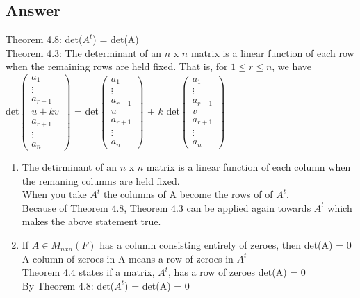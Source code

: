 \documentclass{article}
\newcommand\tab[1][1cm]{\hspace*{#1}}
\begin{document}
\subsection*{Answer}
Theorem 4.8: det(\(A^{t}\)) = det(A)
\\ Theorem 4.3: The determinant of an \(n\) x \(n\) matrix is a linear function of each row when the remaining rows are held fixed. That is, for \(1 \le r \le n\), we have 
\\ \tab[2cm] det\(\begin{pmatrix}a_{1}\\ \vdots \\a_{r-1} \\u + kv \\a_{r+1} \\ \vdots \\a_{n} \end{pmatrix}\) =
	det\(\begin{pmatrix}a_{1}\\ \vdots \\a_{r-1} \\u \\a_{r+1} \\ \vdots \\a_{n} \end{pmatrix}\) +
	\( k\) det\(\begin{pmatrix}a_{1}\\ \vdots \\a_{r-1} \\v \\a_{r+1} \\ \vdots \\a_{n} \end{pmatrix}\)
\\ \begin{enumerate}[label=(\alph{*})]
\item The detirminant of an \(n\) x \(n\) matrix is a linear function of each column when the remaning columns are held fixed.
\\	When you take \(A^{t}\) the columns of A become the rows of of \(A^{t}\).
\\	Because of Theorem 4.8, Theorem 4.3 can be applied again towards \(A^{t}\) which makes the above statement true.
\item If \(A \in M_{nxn}(F)\) has a column consisting entirely of zeroes, then det(A) = 0
	\\A column of zeroes in A means a row of zeroes in \(A^{t}\)
	\\Theorem 4.4 states if a matrix, \(A^{t}\), has a row of zeroes det(A) = 0
	\\By Theorem 4.8: det(\(A^{t}\)) = det(A) = 0
\end{enumerate}
\end{document}
